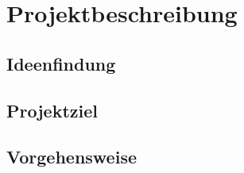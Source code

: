 \chapter{Projektbeschreibung}\label{ch:projektbeschreibung}
\section{Ideenfindung}
\section{Projektziel}\label{projektziel}
\section{Vorgehensweise}
